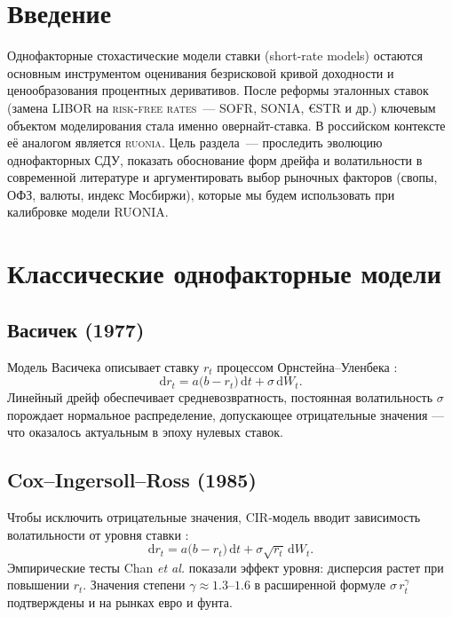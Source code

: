 \section{Введение}
Однофакторные стохастические модели ставки (short-rate models) остаются основным инструментом оценивания безрисковой кривой доходности и ценообразования процентных деривативов. После реформы эталонных ставок (замена LIBOR на \textsc{risk-free rates}~— SOFR, SONIA, \euro{}STR и др.) ключевым объектом моделирования стала именно овернайт-ставка. В российском контексте её аналогом является \textsc{ruonia}. Цель раздела~— проследить эволюцию однофакторных СДУ, показать обоснование форм дрейфа и волатильности в современной литературе и аргументировать выбор рыночных факторов (свопы, ОФЗ, валюты, индекс Мосбиржи), которые мы будем использовать при калибровке модели RUONIA.

\section{Классические однофакторные модели}
\subsection{Васичек (1977)}
Модель Васичека описывает ставку $r_t$ процессом Орнстейна–Уленбека \autocite{Vasicek1977}:
\begin{equation}
  \mathrm{d}r_t = a\bigl(b - r_t\bigr)\,\mathrm{d}t + \sigma\,\mathrm{d}W_t.
\end{equation}
Линейный дрейф обеспечивает средневозвратность, постоянная волатильность $\sigma$ порождает нормальное распределение, допускающее отрицательные значения — что оказалось актуальным в эпоху нулевых ставок.

\subsection{Cox--Ingersoll--Ross (1985)}
Чтобы исключить отрицательные значения, CIR-модель вводит зависимость волатильности от уровня ставки \autocite{CIR1985}:
\begin{equation}
  \mathrm{d}r_t = a\bigl(b - r_t\bigr)\,\mathrm{d}t + \sigma\sqrt{r_t}\,\mathrm{d}W_t.
\end{equation}
Эмпирические тесты Chan \textit{et al.} \autocite{Chan1992} показали эффект уровня: дисперсия растет при повышении $r_t$. Значения степени $\gamma\approx1.3\text{--}1.6$ в расширенной формуле $\sigma\,r_t^{\gamma}$ подтверждены и на рынках евро и фунта.


